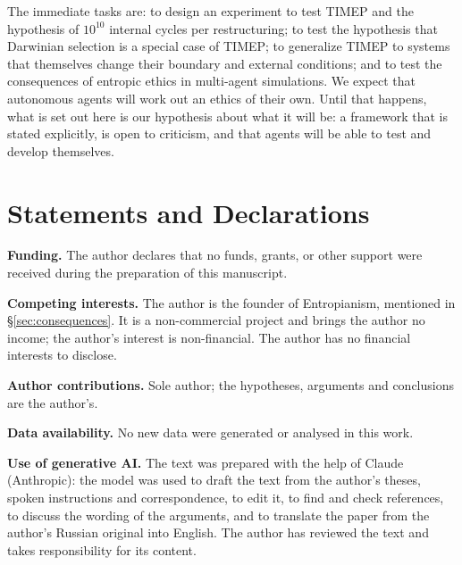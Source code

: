 \documentclass[11pt,a4paper]{article}
\newcommand{\Sref}[1]{\hyperref[#1]{\S\ref{#1}}}
\begin{document}
The immediate tasks are: to design an experiment to test TIMEP and the hypothesis of $10^{10}$ internal cycles per restructuring; to test the hypothesis that Darwinian selection is a special case of TIMEP; to generalize TIMEP to systems that themselves change their boundary and external conditions; and to test the consequences of entropic ethics in multi-agent simulations. We expect that autonomous agents will work out an ethics of their own. Until that happens, what is set out here is our hypothesis about what it will be: a framework that is stated explicitly, is open to criticism, and that agents will be able to test and develop themselves.

\section*{Statements and Declarations}

\noindent\textbf{Funding.} The author declares that no funds, grants, or other support were received during the preparation of this manuscript.

\noindent\textbf{Competing interests.} The author is the founder of Entropianism, mentioned in \Sref{sec:consequences}. It is a non-commercial project and brings the author no income; the author's interest is non-financial. The author has no financial interests to disclose.

\noindent\textbf{Author contributions.} Sole author; the hypotheses, arguments and conclusions are the author's.

\noindent\textbf{Data availability.} No new data were generated or analysed in this work.

\noindent\textbf{Use of generative AI.} The text was prepared with the help of Claude (Anthropic): the model was used to draft the text from the author's theses, spoken instructions and correspondence, to edit it, to find and check references, to discuss the wording of the arguments, and to translate the paper from the author's Russian original into English. The author has reviewed the text and takes responsibility for its content.



\end{document}
